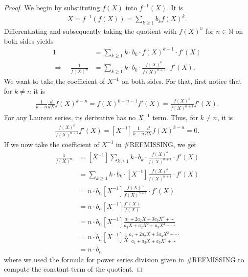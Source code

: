 \documentclass[a4paper]{article}
\theoremstyle{definition}
\begin{document}
\begin{proof}
    We begin by substituting \(f(X)\) into \(f^{-1}(X)\). It is
    \begin{align*}
        X = f^{-1}(f(X)) = \sum_{k \geq 1} b_k f(X)^k \text{.}
    \end{align*}
    Differentiating and subsequently taking the quotient with \(f(X)^n\) for \(n \in \mathbb{N}\) on both sides yields
    \begin{align*}
        1 &= \sum_{k \geq 1} k \cdot b_k \cdot f(X)^{k - 1} \cdot f'(X) \\
        \Rightarrow \quad \frac{1}{f(X)^n} &= \sum_{k \geq 1} k \cdot b_k \cdot \frac{f(X)^{k}}{f(X)^{n+1}} \cdot f'(X) \text{.}
    \end{align*}
    We want to take the coefficient of \(X^{-1}\) on both sides. For that, first notice that for \(k \neq n\) it is
    \begin{align*}
        \frac{1}{k - n} \frac{d}{dX} f(X)^{k - n} = f(X)^{k - n -1} f'(X) = \frac{f(X)^{k}}{f(X)^{n + 1}} f'(X) \text{.}
    \end{align*}
    For any Laurent series, its derivative has no \(X^{-1}\) term. Thus, for \(k \neq n\), it is
    \begin{align*}
        [X^{-1}]\frac{f(X)^{k}}{f(X)^{n + 1}} f'(X) = [X^{-1}] \frac{1}{k - n} \frac{d}{dX} f(X)^{k - n} = 0 \text{.}
    \end{align*}
    If we now take the coefficient of \(X^{-1}\) in \#REFMISSING, we get
    \begin{align}
        [X^{-1}] \frac{1}{f(X)^n} &= [X^{-1}] \sum_{k \geq 1} k \cdot b_k \cdot \frac{f(X)^{k}}{f(X)^{n+1}} \cdot f'(X) \\
        &= \sum_{k \geq 1} k \cdot b_k \cdot [X^{-1}] \frac{f(X)^{k}}{f(X)^{n+1}} \cdot f'(X) \\
        &= n \cdot b_n [X^{-1}] \frac{f(X)^n}{f(X)^{n+1}} \cdot f'(X) \\
        &= n \cdot b_n [X^{-1}] \frac{f'(X)}{f(X)} \\
        &= n \cdot b_n [X^{-1}] \frac{a_1 + 2 a_2 X + 3 a_3 X^2 + \cdots}{a_1 X + a_2 X^2 + a_3 X^3 + \cdots} \\
        &= n \cdot b_n [X^{-1}] \frac{1}{X} \frac{a_1 + 2 a_2 X + 3 a_3 X^2 + \cdots}{a_1 + a_2 X + a_3 X^2 + \cdots} \\
        &= n \cdot b_n
    \end{align}
    where we used the formula for power series division given in \#REFMISSING to compute the constant term of the quotient.

\end{proof}
\end{document}
